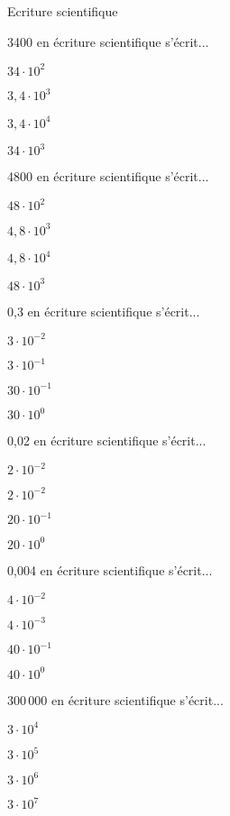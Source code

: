 \documentclass[12pt]{article}
\begin{document}
\begin{quiz}{Ecriture scientifique}
\begin{multi}[points=1]{}
3400 en écriture scientifique s'écrit...
\item $34\cdot 10^2$
\item   * $3,4\cdot 10^3$
\item  $3,4\cdot 10^4$
\item  $34\cdot 10^3$
\end{multi}

\begin{multi}[points=1]{}
4800 en écriture scientifique s'écrit...
\item $48\cdot 10^2$
\item   * $4,8\cdot 10^3$
\item  $4,8\cdot 10^4$
\item  $48\cdot 10^3$
\end{multi}

\begin{multi}[points=1]{}
0,3 en écriture scientifique s'écrit...
\item $3\cdot 10^{-2}$
\item   * $3\cdot 10^{-1}$
\item  $30\cdot 10^{-1}$
\item  $30\cdot 10^{0}$
\end{multi}

\begin{multi}[points=1]{}
0,02 en écriture scientifique s'écrit...
\item $2\cdot 10^{-2}$
\item   * $2\cdot 10^{-2}$
\item  $20\cdot 10^{-1}$
\item  $20\cdot 10^{0}$
\end{multi}

\begin{multi}[points=1]{}
0,004 en écriture scientifique s'écrit...
\item $4\cdot 10^{-2}$
\item   * $4\cdot 10^{-3}$
\item  $40\cdot 10^{-1}$
\item  $40\cdot 10^{0}$
\end{multi}

\begin{multi}[points=1]{}
300\,000 en écriture scientifique s'écrit...
\item $3\cdot 10^{4}$
\item   * $3\cdot 10^{5}$
\item  $3\cdot 10^{6}$
\item  $3\cdot 10^{7}$
\end{multi}


\end{quiz}
\end{document}
